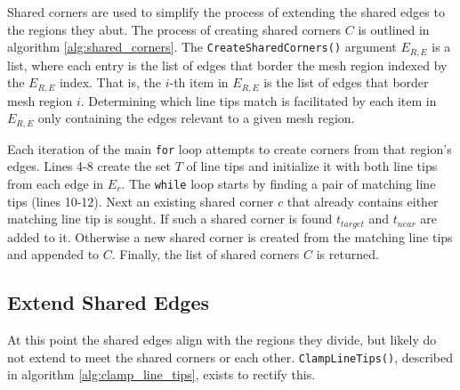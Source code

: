 Shared corners are used to simplify the process of extending the shared edges to the regions they abut.
The process of creating shared corners $C$ is outlined in algorithm \ref{alg:shared_corners}.
The \verb|CreateSharedCorners()| argument $E_{R,E}$ is a list, where each entry is the list of edges that border the mesh region indexed by the $E_{R,E}$ index.
That is, the $i$-th item in $E_{R,E}$ is the list of edges that border mesh region $i$.
Determining which line tips match is facilitated by each item in $E_{R,E}$ only containing the edges relevant to a given mesh region.

Each iteration of the main \verb|for| loop attempts to create corners from that region's edges.
Lines 4-8 create the set $T$ of line tips and initialize it with both line tips from each edge in $E_r$.
The \verb|while| loop starts by finding a pair of matching line tips (lines 10-12).
Next an existing shared corner $c$ that already contains either matching line tip is sought.
If such a shared corner is found $t_{target}$ and $t_{near}$ are added to it.
Otherwise a new shared corner is created from the matching line tips and appended to $C$.
Finally, the list of shared corners $C$ is returned.

\subsection{Extend Shared Edges}
At this point the shared edges align with the regions they divide, but likely do not extend to meet the shared corners or each other.
\verb|ClampLineTips()|, described in algorithm \ref{alg:clamp_line_tips}, exists to rectify this.

